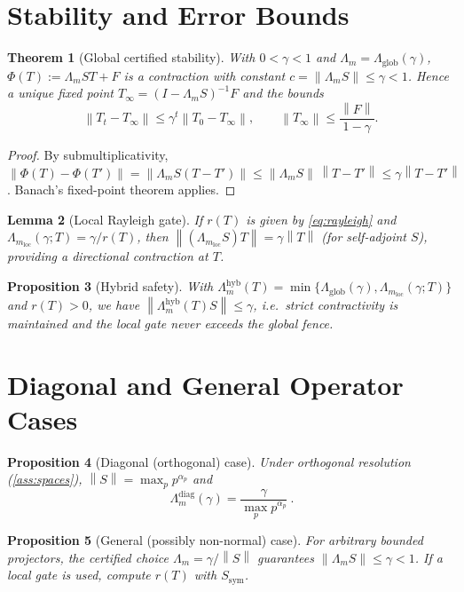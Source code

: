\documentclass[11pt]{article}
\newtheorem{theorem}{Theorem}
\newtheorem{lemma}[theorem]{Lemma}
\newtheorem{proposition}[theorem]{Proposition}
\theoremstyle{definition}
\newcommand{\Lglob}{\Lambda_{\mathrm{glob}}}
\newcommand{\Lm}{\Lambda_m}
\newcommand{\norm}[1]{\left\lVert #1\right\rVert}
\begin{document}
\section{Stability and Error Bounds}
\begin{theorem}[Global certified stability]\label{thm:global}
With $0<\gamma<1$ and $\Lm=\Lglob(\gamma)$, $\Phi(T):=\Lm S T+F$ is a contraction with constant $c=\norm{\Lm S}\le\gamma<1$. Hence a unique fixed point $T_\infty=(I-\Lm S)^{-1}F$ and the bounds
\[
\norm{T_t-T_\infty}\le \gamma^t \norm{T_0-T_\infty},\qquad \norm{T_\infty}\le \frac{\norm{F}}{1-\gamma}.
\]
\end{theorem}
\begin{proof}
By submultiplicativity, $\norm{\Phi(T)-\Phi(T')}=\norm{\Lm S(T-T')}\le \norm{\Lm S}\,\norm{T-T'}\le\gamma\norm{T-T'}$. Banach's fixed-point theorem applies.
\end{proof}

\begin{lemma}[Local Rayleigh gate]\label{lem:local}
If $r(T)$ is given by \eqref{eq:rayleigh} and $\Lm_{\mathrm{loc}}(\gamma;T)=\gamma/r(T)$, then $\norm{(\Lm_{\mathrm{loc}}S)T}=\gamma\norm{T}$ (for self-adjoint $S$), providing a directional contraction at $T$.
\end{lemma}

\begin{proposition}[Hybrid safety]\label{prop:hybrid}
With $\Lm^{\mathrm{hyb}}(T)=\min\{\Lglob(\gamma),\Lm_{\mathrm{loc}}(\gamma;T)\}$ and $r(T)>0$, we have $\norm{\Lm^{\mathrm{hyb}}(T)S}\le\gamma$, i.e.\ strict contractivity is maintained and the local gate never exceeds the global fence.
\end{proposition}

\section{Diagonal and General Operator Cases}
\begin{proposition}[Diagonal (orthogonal) case]\label{prop:diag}
Under orthogonal resolution (\cref{ass:spaces}), $\norm{S}=\max_p p^{\alpha_p}$ and
\[
\boxed{\ \Lm^{\mathrm{diag}}(\gamma)=\frac{\gamma}{\max_{p} p^{\alpha_p}}\ }.
\]
\end{proposition}

\begin{proposition}[General (possibly non-normal) case]\label{prop:general}
For arbitrary bounded projectors, the certified choice $\Lm=\gamma/\norm{S}$ guarantees $\norm{\Lm S}\le\gamma<1$. If a local gate is used, compute $r(T)$ with $S_{\mathrm{sym}}$.
\end{proposition}
\end{document}
